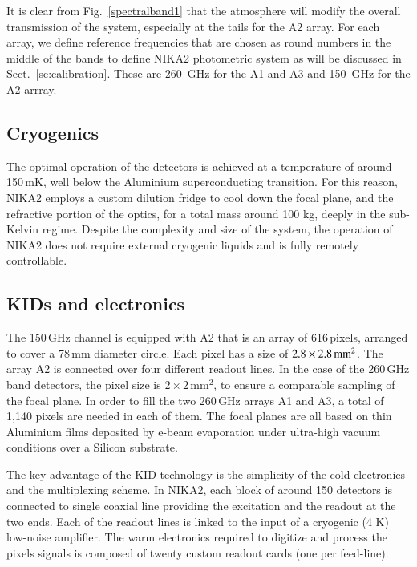 It is clear from Fig.~\ref{spectralband1} that the atmosphere will
modify the overall transmission of the system, especially at the tails
for the A2 array.
For each array, we define reference frequencies that are chosen
as round numbers in the middle of the bands to define NIKA2
photometric system as will be discussed in
Sect.~\ref{se:calibration}. These are 260~GHz for the A1 and A3 and
150~GHz for the A2 arrray.

\subsection{Cryogenics}

The optimal operation of the detectors is achieved at a temperature of around
150\,mK, well below the Aluminium superconducting transition. For this reason,
NIKA2 employs a custom dilution fridge to cool down the focal plane, and the
refractive portion of the optics, for a total mass around 100 kg, deeply in the
sub-Kelvin regime. Despite the complexity and size of the system, the operation
of NIKA2 does not require external cryogenic liquids and is fully remotely
controllable.

\subsection{KIDs and electronics}
\label{se:array}

The 150\,GHz channel is equipped with A2 that is an array of
616\,pixels, arranged to cover a 78\,mm diameter circle. Each pixel has a size of
$2.8\times2.8\textrm{\,mm}^2$. The array A2 is connected over four different
readout lines. In the case of the 260\,GHz band detectors, the pixel size is
$2\times 2\mathrm{\,mm}^2$, to ensure a comparable sampling of the focal
plane. In order to fill the two 260\,GHz arrays A1 and A3, a total of 1,140 pixels are
needed in each of them. The focal planes are all based on thin Aluminium films
deposited by e-beam evaporation under ultra-high vacuum conditions over a
Silicon substrate.

The key advantage of the KID technology is the simplicity of the cold
electronics and the multiplexing scheme. In NIKA2, each block of around 150
detectors is connected to single coaxial line providing the excitation and the
readout at the two ends. Each of the readout lines is linked to the input of a
cryogenic (4 K) low-noise amplifier. The warm electronics required to digitize
and process the pixels signals is composed of twenty custom readout cards (one
per feed-line).

